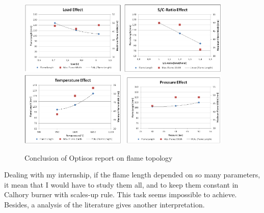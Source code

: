 \begin{figure}[h!]
  \centering
\includegraphics[width=0.45\textwidth]{fig/Optisos_Load_effect.PNG}
\includegraphics[width=0.45\textwidth]{fig/Optisos_S_C_effect.PNG}
\includegraphics[width=0.45\textwidth]{fig/Optisos_temperature_effect.PNG}
\includegraphics[width=0.45\textwidth]{fig/Optisos_Pressure_effect.PNG}
  \caption{Conclusion of Optisos report on flame topology}
 \label{optisos_plot}
\end{figure}

Dealing with my internship, if the flame length depended on so many parameters, it mean that I would have to study them all, and to keep them constant in Calhory burner with scales-up rule. This task seems impossible to achieve. Besides, a analysis of  the literature gives another interpretation. 

